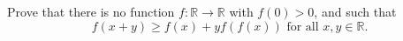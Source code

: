 Prove that there is no function $f: \mathbb{R} \rightarrow \mathbb{R}$ with $f(0) >0$, and such that
\[f(x+y) \geq f(x) +yf(f(x)) \text{ for all } x,y \in \mathbb{R}. \]